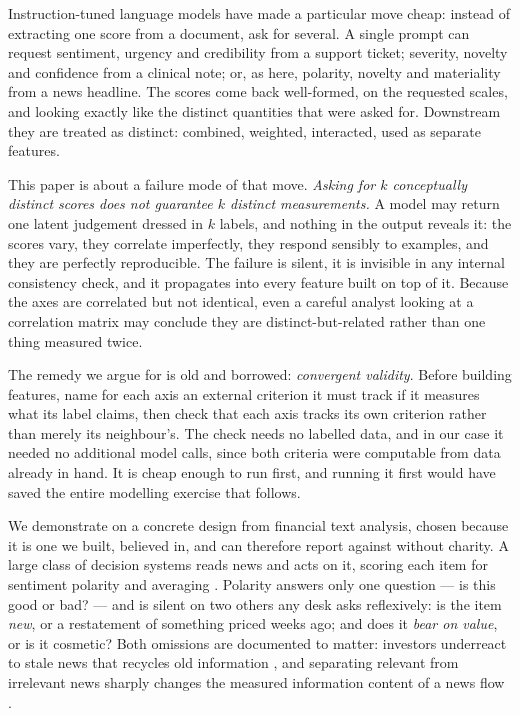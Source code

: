 Instruction-tuned language models have made a particular move cheap: instead of
extracting one score from a document, ask for several. A single prompt can request
sentiment, urgency and credibility from a support ticket; severity, novelty and
confidence from a clinical note; or, as here, polarity, novelty and materiality
from a news headline. The scores come back well-formed, on the requested scales,
and looking exactly like the distinct quantities that were asked for. Downstream
they are treated as distinct: combined, weighted, interacted, used as separate
features.

This paper is about a failure mode of that move. \emph{Asking for $k$ conceptually
distinct scores does not guarantee $k$ distinct measurements.} A model may return
one latent judgement dressed in $k$ labels, and nothing in the output reveals it:
the scores vary, they correlate imperfectly, they respond sensibly to examples, and
they are perfectly reproducible. The failure is silent, it is invisible in any
internal consistency check, and it propagates into every feature built on top of
it. Because the axes are correlated but not identical, even a careful analyst
looking at a correlation matrix may conclude they are distinct-but-related rather
than one thing measured twice.

The remedy we argue for is old and borrowed: \emph{convergent validity}. Before
building features, name for each axis an external criterion it must track if it
measures what its label claims, then check that each axis tracks its own criterion
rather than merely its neighbour's. The check needs no labelled data, and in our
case it needed no additional model calls, since both criteria were computable from
data already in hand. It is cheap enough to run first, and running it first would
have saved the entire modelling exercise that follows.

We demonstrate on a concrete design from financial text analysis, chosen because
it is one we built, believed in, and can therefore report against without
charity. A large class of decision systems reads news and acts on it, scoring each
item for sentiment polarity and averaging \citep{tetlock2007, tetlock2008,
antweiler2004, loughran2011, loughran2016}. Polarity answers only one question ---
is this good or bad? --- and is silent on two others any desk asks reflexively: is
the item \emph{new}, or a restatement of something priced weeks ago; and does it
\emph{bear on value}, or is it cosmetic? Both omissions are documented to matter:
investors underreact to stale news that recycles old information
\citep{tetlock2011}, and separating relevant from irrelevant news sharply changes
the measured information content of a news flow \citep{boudoukh2019}.

